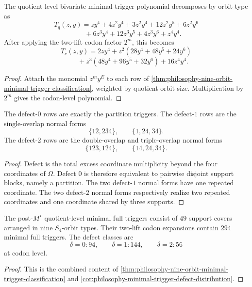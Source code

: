 \begin{corollary}
\label{cor:philosophy-orbit-expansion-minimal-trigger-polynomial}
The quotient-level bivariate minimal-trigger polynomial decomposes by
orbit type as
$$
  T_{q}(z,y)
  =
  zy^{4}
  +
  4z^{2}y^{4}
  +
  3z^{2}y^{4}
  +
  12z^{2}y^{5}
  +
  6z^{2}y^{6}
$$
$$
  \qquad
  +
  6z^{3}y^{4}
  +
  12z^{3}y^{5}
  +
  4z^{3}y^{6}
  +
  z^{4}y^{4}.
$$
After applying the two-lift codon factor $2^{m}$, this becomes
$$
  T_{c}(z,y)
  =
  2zy^{4}
  +
  z^{2}(28y^{4}+48y^{5}+24y^{6})
$$
$$
  \qquad
  +
  z^{3}(48y^{4}+96y^{5}+32y^{6})
  +
  16z^{4}y^{4}.
$$
\end{corollary}
\begin{proof}
Attach the monomial $z^{m}y^{E}$ to each row of
\autoref{thm:philosophy-nine-orbit-minimal-trigger-classification},
weighted by quotient orbit size. Multiplication by $2^{m}$ gives the
codon-level polynomial.
\end{proof}

\begin{corollary}
\label{cor:philosophy-partition-overlap-mechanisms}
The defect-$0$ rows are exactly the partition triggers. The defect-$1$
rows are the single-overlap normal forms
$$
  \{12,234\},
  \qquad
  \{1,24,34\}.
$$
The defect-$2$ rows are the double-overlap and triple-overlap normal
forms
$$
  \{123,124\},
  \qquad
  \{14,24,34\}.
$$
\end{corollary}
\begin{proof}
Defect is the total excess coordinate multiplicity beyond the four
coordinates of $\Omega$. Defect $0$ is therefore equivalent to pairwise
disjoint support blocks, namely a partition. The two defect-$1$ normal
forms have one repeated coordinate. The two defect-$2$ normal forms
respectively realize two repeated coordinates and one coordinate shared
by three supports.
\end{proof}

\begin{theorem}
\label{thm:philosophy-nine-orbit-minimal-trigger-theorem}
The post-$M^{\star}$ quotient-level minimal full triggers consist of
$49$ support covers arranged in nine $S_{4}$-orbit types. Their
two-lift codon expansions contain $294$ minimal full triggers. The
defect classes are
$$
  \delta=0:94,
  \qquad
  \delta=1:144,
  \qquad
  \delta=2:56
$$
at codon level.
\end{theorem}
\begin{proof}
This is the combined content of
\autoref{thm:philosophy-nine-orbit-minimal-trigger-classification} and
\autoref{cor:philosophy-minimal-trigger-defect-distribution}.
\end{proof}

